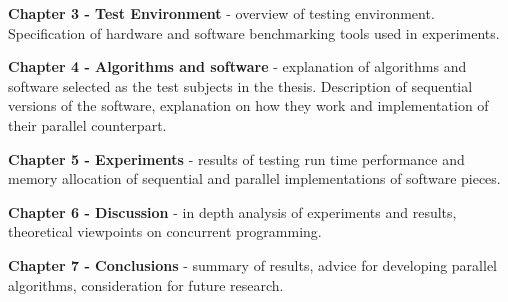\noindent
\textbf{Chapter 3 - Test Environment} - overview of testing environment. Specification of hardware and software benchmarking tools used in experiments.

\noindent
\textbf{Chapter 4 - Algorithms and software} - explanation of algorithms and software selected as the test subjects in the thesis. Description of sequential versions of the software, explanation on how they work and implementation of their parallel counterpart. 

\noindent
\textbf{Chapter 5 - Experiments} - results of testing run time performance and memory allocation of sequential and parallel implementations of software pieces.

\noindent
\textbf{Chapter 6 - Discussion} - in depth analysis of experiments and results, theoretical viewpoints on concurrent programming.

\noindent
\textbf{Chapter 7 - Conclusions} - summary of results, advice for developing parallel algorithms, consideration for future research.

